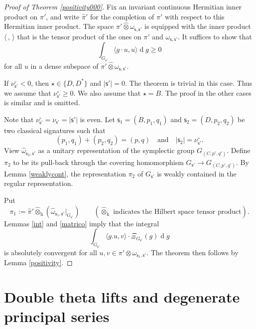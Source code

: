 \documentclass[12pt,a4paper]{amsart}
\def\abs#1{\left|{#1}\right|}
\newcommand{\od}{\operatorname{d}}
\newcommand{\la}{\langle}
\newcommand{\ra}{\rangle}
\numberwithin{equation}{section}
\theoremstyle{remark}
\begin{document}
\begin{proof}[Proof of Theorem \ref{positivity000}]
Fix an invariant continuous Hermitian inner product on $\pi'$, and  write $\hat \pi'$ for the completion of $\pi'$ with respect to this Hermitian inner product.
The space $\pi' \widehat \otimes \omega_{\mathsf s, \mathsf s'}$ is equipped with the  inner product $\la\,,\,\ra$  that is the tensor product of the ones on $\pi'$ and $\omega_{\mathsf s, \mathsf s'} $. It suffices to show that
\[
  \int_{G_{\mathsf s'}}\la g \cdot u,u\ra\od\! g\geq 0
\]
for all $u$ in a dense subspace of $\pi' \widehat \otimes \omega_{\mathsf s, \mathsf s'}$.

If $\nu^\circ_{\mathsf s'}<0$, then $\star\in \{D, D^*\}$ and $\abs{\mathsf s'}=0$. The theorem is trivial in this case.  Thus we assume that $\nu^\circ_{\mathsf s'}\geq 0$.
We also assume that $\star=B$. The proof in the other cases is similar and is omitted.

Note that $\nu^\circ_{\mathsf s'}=\nu_{\mathsf s'}=\abs{\mathsf s'}$ is even.
 Let $\mathsf s_1=(B, p_1, q_1)$ and  $\mathsf s_2=(D, p_2, q_2)$ be two classical signatures such that
\[
  (p_1, q_1)+(p_2, q_2)=(p,q)\quad \textrm{and}\quad \abs{\mathsf s_2}=\nu^\circ_{\mathsf s'}.
\]
View $\hat \omega_{\mathsf s_2, \mathsf s'}$ as a unitary representation of the symplectic group $G_{(C, p',q')}$.
Define $\pi_2$ to be its  pull-back through the covering homomorphism $G_{\mathsf s'}\rightarrow G_{(C, p',q')}$. By Lemma \ref{weaklycont}, the representation $\pi_2$ of $G_{\mathsf s'}$ is weakly contained in the regular representation.

Put
\[
  \pi_1:=\hat \pi'\widehat \otimes_{\mathrm h} (\hat \omega_{\mathsf s_1, \mathsf s'}|_{G_{\mathsf s'}})\qquad (\textrm{$\widehat \otimes_{\mathrm h}$ indicates the Hilbert space tensor product}).
\]
 Lemmas  \ref{int} and \ref{matrico} imply that the integral
\[
 \int_{G_{\mathsf s'}} \la g.u,v\ra \cdot \Xi_{G_{\mathsf s'}}(g)\od\!g
\]
is absolutely convergent for all $u,v\in \pi' \otimes \omega_{\mathsf s_1, \mathsf s'}$. The theorem then follows by Lemma \ref{positivity}.



\end{proof}



\section{Double theta lifts and degenerate principal series}
\end{document}
